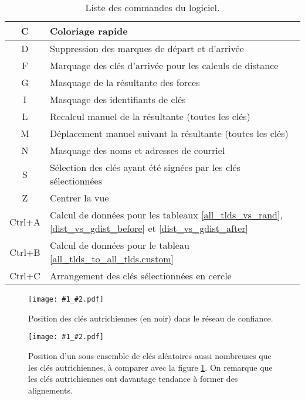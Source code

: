 \documentclass[a4paper]{article}
\newcommand{\img}[3]{
\begin{figure}
\centering
\texttt{[image: \#1\_\#2.pdf]}
\caption{#3}
\label{img_#2}
\end{figure}
}
\begin{document}
\begin{table}[p]
\begin{tabular}{|c|l|}
\hline C & Coloriage rapide \\
\hline D & Suppression des marques de départ et d'arrivée \\
\hline F & Marquage des clés d'arrivée pour les calculs de distance \\
\hline G & Masquage de la résultante des forces \\
\hline I & Masquage des identifiants de clés \\
\hline L & Recalcul manuel de la résultante (toutes les clés) \\
\hline M & Déplacement manuel suivant la résultante (toutes les clés) \\
\hline N & Masquage des noms et adresses de courriel \\
\hline S & Sélection des clés ayant été signées par les clés sélectionnées \\
\hline Z & Centrer la vue \\
\hline Ctrl+A & Calcul de données pour les tableaux \ref{all_tlds_vs_rand}, \ref{dist_vs_gdist_before} et \ref{dist_vs_gdist_after} \\
\hline Ctrl+B & Calcul de données pour le tableau \ref{all_tlds_to_all_tlds.custom} \\
\hline Ctrl+C & Arrangement des clés sélectionnées en cercle \\
\hline
\end{tabular}
\caption{Liste des commandes du logiciel.}
\label{commands}
\end{table}


\img{images/r2002}{at}{Position des clés autrichiennes (en noir) dans le réseau de confiance.}

\img{images/r2002}{rnd_at}{Position d'un sous-ensemble de clés aléatoires aussi nombreuses que les clés autrichiennes, à comparer avec la figure \ref{img_at}. On remarque que les clés autrichiennes ont davantage tendance à former des alignements.}




\end{document}
